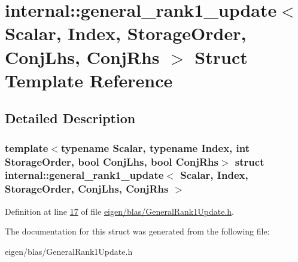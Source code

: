 \hypertarget{structinternal_1_1general__rank1__update}{}\section{internal\+:\+:general\+\_\+rank1\+\_\+update$<$ Scalar, Index, Storage\+Order, Conj\+Lhs, Conj\+Rhs $>$ Struct Template Reference}
\label{structinternal_1_1general__rank1__update}


\subsection{Detailed Description}
\subsubsection*{template$<$typename Scalar, typename Index, int Storage\+Order, bool Conj\+Lhs, bool Conj\+Rhs$>$\newline
struct internal\+::general\+\_\+rank1\+\_\+update$<$ Scalar, Index, Storage\+Order, Conj\+Lhs, Conj\+Rhs $>$}



Definition at line \hyperlink{eigen_2blas_2_general_rank1_update_8h_source_l00017}{17} of file \hyperlink{eigen_2blas_2_general_rank1_update_8h_source}{eigen/blas/\+General\+Rank1\+Update.\+h}.



The documentation for this struct was generated from the following file\+:\begin{DoxyCompactItemize}
\item 
eigen/blas/\+General\+Rank1\+Update.\+h\end{DoxyCompactItemize}
